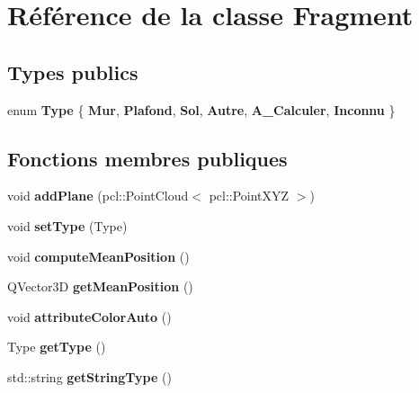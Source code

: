 \hypertarget{classFragment}{}\section{Référence de la classe Fragment}
\label{classFragment}
\subsection*{Types publics}
\begin{DoxyCompactItemize}
\item 
\mbox{\label{classFragment_a9e632cbe32b286e667c244f0cac5c25d}} 
enum {\bfseries Type} \{ \newline
{\bfseries Mur}, 
{\bfseries Plafond}, 
{\bfseries Sol}, 
{\bfseries Autre}, 
\newline
{\bfseries A\+\_\+\+Calculer}, 
{\bfseries Inconnu}
 \}
\end{DoxyCompactItemize}
\subsection*{Fonctions membres publiques}
\begin{DoxyCompactItemize}
\item 
\mbox{\label{classFragment_a5da4b1f26385fce802f1ef108c84a86c}} 
void {\bfseries add\+Plane} (pcl\+::\+Point\+Cloud$<$ pcl\+::\+Point\+X\+YZ $>$)
\item 
\mbox{\label{classFragment_acddb6a660674739e83c46e32ac7a087e}} 
void {\bfseries set\+Type} (Type)
\item 
\mbox{\label{classFragment_a186c1f7d8e132ded49f2ce26f541318d}} 
void {\bfseries compute\+Mean\+Position} ()
\item 
\mbox{\label{classFragment_af4458206e0a2993e54a91fd98d3cc6da}} 
Q\+Vector3D {\bfseries get\+Mean\+Position} ()
\item 
\mbox{\label{classFragment_af284ba2902d577c5cdfac48c35ea39f4}} 
void {\bfseries attribute\+Color\+Auto} ()
\item 
\mbox{\label{classFragment_a892ecf8bc007a6742bfd118f04d13309}} 
Type {\bfseries get\+Type} ()
\item 
\mbox{\label{classFragment_a93a4058a4802913e27b064717a2d27a0}} 
std\+::string {\bfseries get\+String\+Type} ()
\end{DoxyCompactItemize}
